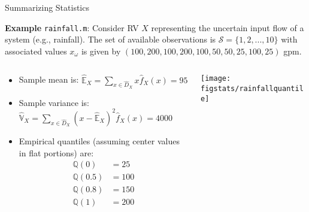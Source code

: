 \documentclass[9pt]{beamer}
\begin{document}
\begin{frame}{Summarizing Statistics}
\begin{block}{}
{\bf Example} {\tt rainfall.m}:  Consider RV $X$ representing the uncertain input flow of a system (e.g., rainfall). The set of available observations is $\mathcal{S}=\{1,2,...,10\}$ with associated values $x_\omega$ is given by $(100,200,100,200,100,50,50,25,100,25)$ gpm. 
\end{block}
\vspace{0.2in}
  \begin{columns}
    \begin{column}{0.6\textwidth}
\begin{itemize} 
\item Sample mean is: $\hat{\mathbb{E}}_X=\sum_{x\in \hat{D}_X}x\hat{f}_X(x)=95$   
\item Sample variance is: $\hat{\mathbb{V}}_X=\sum_{x\in \hat{D}_X}(x-\hat{\mathbb{E}}_X)^2\hat{f}_X(x)=4000$   
\item Empirical quantiles (assuming center values in flat portions) are:  
\begin{align*}
\mathbb{Q}(0)&=25\\
\mathbb{Q}(0.5)&=100\\
\mathbb{Q}(0.8)&=150\\
\mathbb{Q}(1)&=200
\end{align*}
\end{itemize}
\end{column}
 \begin{column}{0.4\textwidth}
       \texttt{[image: figstats/rainfallquantile]}\\
 \end{column}
\end{columns}
\end{frame}
\end{document}
